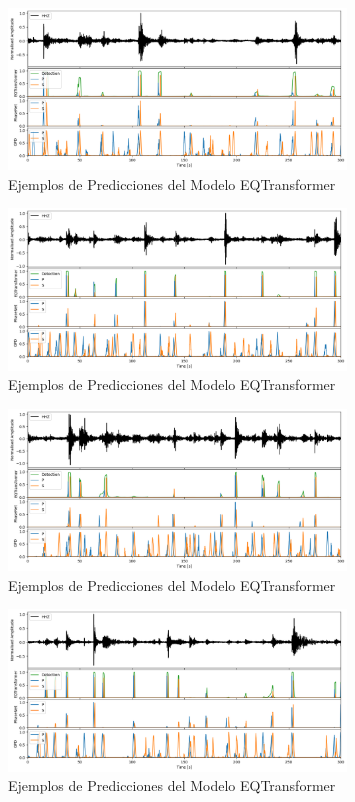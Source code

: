 \begin{figure}
\centering
\includegraphics[width=0.8\textwidth]{figures/testing/image5.png}
\caption{Ejemplos de Predicciones del Modelo EQTransformer}
\label{fig:predicciones}
\end{figure}

\begin{figure}
\centering
\includegraphics[width=0.8\textwidth]{figures/testing/image6.png}
\caption{Ejemplos de Predicciones del Modelo EQTransformer}
\label{fig:predicciones}
\end{figure}

\begin{figure}
\centering
\includegraphics[width=0.8\textwidth]{figures/testing/image7.png}
\caption{Ejemplos de Predicciones del Modelo EQTransformer}
\label{fig:predicciones}
\end{figure}

\begin{figure}
\centering
\includegraphics[width=0.8\textwidth]{figures/testing/image8.png}
\caption{Ejemplos de Predicciones del Modelo EQTransformer}
\label{fig:predicciones}
\end{figure}

